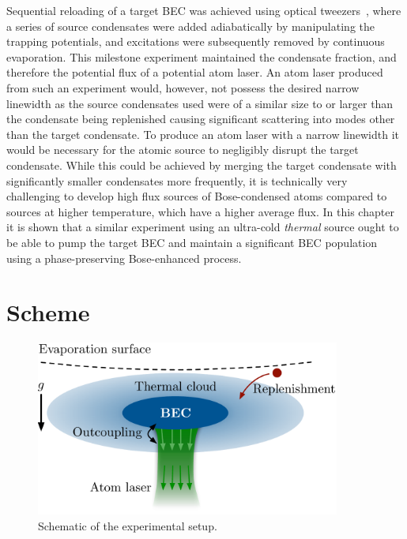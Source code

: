 Sequential reloading of a target BEC was achieved using optical tweezers~\citep{Chikkatur:2002qa}, where a series of source condensates were added adiabatically by manipulating the trapping potentials, and excitations were subsequently removed by continuous evaporation. This milestone experiment maintained the condensate fraction, and therefore the potential flux of a potential atom laser. An atom laser produced from such an experiment would, however, not possess the desired narrow linewidth as the source condensates used were of a similar size to or larger than the condensate being replenished causing significant scattering into modes other than the target condensate. To produce an atom laser with a narrow linewidth it would be necessary for the atomic source to negligibly disrupt the target condensate.  While this could be achieved by merging the target condensate with significantly smaller condensates more frequently, it is technically very challenging to develop high flux sources of Bose-condensed atoms compared to sources at higher temperature, which have a higher average flux. In this chapter it is shown that a similar experiment using an ultra-cold \emph{thermal} source ought to be able to pump the target BEC and maintain a significant BEC population using a phase-preserving Bose-enhanced process.



\section{Scheme}
\label{KineticTheory:Scheme}

\begin{figure}
    \centering
        \includegraphics[width=10cm]{QKTScheme}
    \caption{Schematic of the experimental setup.}
    \label{KineticTheory:QKTScheme}
\end{figure}

